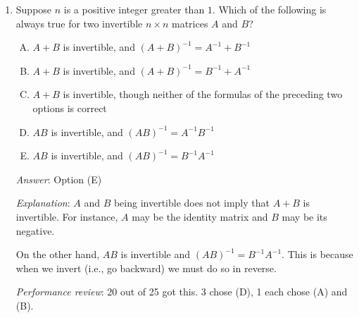 \documentclass[10pt]{amsart}
\begin{document}
\begin{enumerate}
  \begin{itemize}
  \item For distinct $i,j$ in $\{ 1,2,\dots,n \}$, the $(ij)^{th}$
    entry of $A^{-1}A$ is $0$. This translates to saying that the
    $i^{th}$ row of $A^{-1}$ is orthogonal to the $j^{th}$ column of
    $A$.
  \item For any $i$ in $\{ 1,2,\dots, n\}$, the $(ii)^{th}$ entry of
    $A^{-1}A$ is $1$. This translates to saying that the dot product of
    the $i^{th}$ row of $A^{-1}$ and the $i^{th}$ column of $A$ is
    equal to $1$.
  \end{itemize}

  {\em Performance review}: 14 out of 25 got this. 6 chose (C), 3
  chose (D), 1 each chose (A) and (B).

  \vspace{0.3in}

  The remaining questions review your skills at abstract behavior
  prediction.

\item Suppose $n$ is a positive integer greater than $1$. Which of the
  following is always true for two invertible $n \times n$ matrices
  $A$ and $B$?

  \begin{enumerate}[(A)]
  \item $A + B$ is invertible, and $(A + B)^{-1} = A^{-1} + B^{-1}$
  \item $A + B$ is invertible, and $(A + B)^{-1} = B^{-1} + A^{-1}$
  \item $A + B$ is invertible, though neither of the formulas of the
    preceding two options is correct
  \item $AB$ is invertible, and $(AB)^{-1} = A^{-1}B^{-1}$
  \item $AB$ is invertible, and $(AB)^{-1} = B^{-1}A^{-1}$
  \end{enumerate}

  {\em Answer}: Option (E)

  {\em Explanation}: $A$ and $B$ being invertible does not imply that
  $A + B$ is invertible. For instance, $A$ may be the identity matrix
  and $B$ may be its negative.

  On the other hand, $AB$ is invertible and $(AB)^{-1} =
  B^{-1}A^{-1}$. This is because when we invert (i.e., go backward) we
  must do so in reverse.

  {\em Performance review}: 20 out of 25 got this. 3 chose (D), 1 each
  chose (A) and (B).


\end{enumerate}
\end{document}
